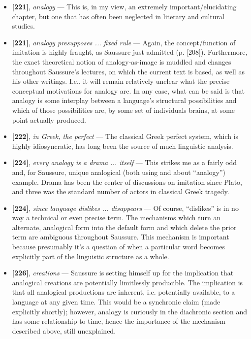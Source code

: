 \documentclass[12pt]{article}
\begin{document}
\begin{itemize}

\item \textbf{[221]}, \textit{analogy} --- This is, in my view, an extremely important/elucidating chapter, but one that has often been neglected in literary and cultural studies.

\item \textbf{[221]}, \textit{analogy presupposes ... fixed rule} --- Again, the concept/function of imitation is highly fraught, as Saussure just admitted (p. [208]). Furthermore, the exact theoretical notion of analogy-as-image is muddled and changes throughout Saussure's lectures, on which the current text is based, as well as his other writings. I.e., it will remain relatively unclear what the precise conceptual motivations for analogy are. In any case, what can be said is that analogy is some interplay between a language's structural possibilities and which of those possibilities are, by some set of individuals brains, at some point actually produced.

\item \textbf{[222]}, \textit{in Greek, the perfect} --- The classical Greek perfect system, which is highly idiosyncratic, has long been the source of much linguistic analysis.

\item \textbf{[224]}, \textit{every analogy is a drama ... itself} --- This strikes me as a fairly odd and, for Saussure, unique analogical (both using and about ``analogy'') example. Drama has been the center of discussions on imitation since Plato, and three was the standard number of actors in classical Greek tragedy.

\item \textbf{[224]}, \textit{since language dislikes ... disappears} --- Of course, ``dislikes'' is in no way a technical or even precise term. The mechanisms which turn an alternate, analogical form into the default form and which delete the prior term are ambiguous throughout Saussure. This mechanism is important because presumably it's a question of when a particular word becomes explicitly part of the linguistic structure as a whole.

\item \textbf{[226]}, \textit{creations} --- Saussure is setting himself up for the implication that analogical creations are potentially limitlessly producible. The implication is that all analogical productions are inherent, i.e. potentially available, to a language at any given time. This would be a synchronic claim (made explicitly shortly); however, analogy is curiously in the diachronic section and has some relationship to time, hence the importance of the mechanism described above, still unexplained.


\end{itemize}
\end{document}
